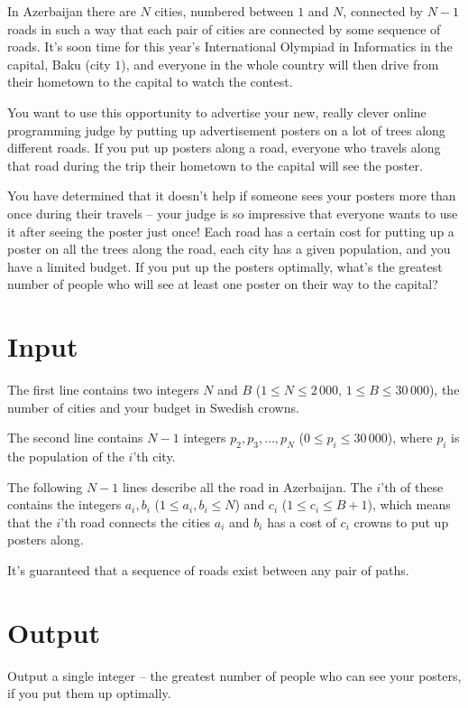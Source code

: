 \noindent
In Azerbaijan there are $N$ cities, numbered between $1$ and $N$, connected by $N - 1$ roads in such a way
that each pair of cities are connected by some sequence of roads.
It's soon time for this year's International Olympiad in Informatics in the capital, Baku (city $1$),
and everyone in the whole country will then drive from their hometown to the capital to watch the contest.

You want to use this opportunity to advertise your new, really clever online programming judge by putting up
advertisement posters on a lot of trees along different roads.
If you put up posters along a road, everyone who travels along that road during the trip their hometown to the
capital will see the poster.

You have determined that it doesn't help if someone sees your posters more than once during their travels
-- your judge is so impressive that everyone wants to use it after seeing the poster just once!
Each road has a certain cost for putting up a poster on all the trees along the road, each city has a given
population, and you have a limited budget. If you put up the posters optimally, what's the greatest number of
people who will see at least one poster on their way to the capital?

\section*{Input}
The first line contains two integers $N$ and $B$ ($1 \le N \le 2\,000$, $1 \le B \le 30\,000$), the number of cities and your budget in Swedish crowns.

The second line contains $N-1$ integers $p_2, p_3, \dots, p_N$ ($0 \le p_i \le 30\,000$), where
$p_i$ is the population of the $i$'th city.

The following $N-1$ lines describe all the road in Azerbaijan.
The $i$'th of these contains the integers $a_i, b_i$ ($1 \le a_i, b_i \le N$) and $c_i$ ($1 \le c_i \le B+1$), which
means that the $i$'th road connects the cities $a_i$ and $b_i$ has a cost of $c_i$ crowns to put up posters along.

It's guaranteed that a sequence of roads exist between any pair of paths.

\section*{Output}
Output a single integer -- the greatest number of people who can see your posters, if you put them up optimally.


